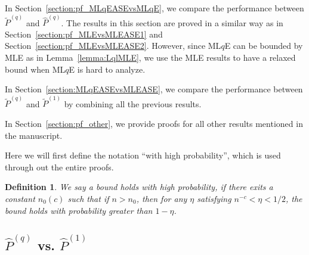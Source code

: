 \documentclass[a4paper]{article}
\newtheorem{definition}[fact]{Definition}
\renewcommand{\hat}{\widehat}
\begin{document}
In Section~\ref{section:pf_MLqEASEvsMLqE}, we compare the performance between $\widetilde{P}^{(q)}$ and $\hat{P}^{(q)}$. The results in this section are proved in a similar way as in Section~\ref{section:pf_MLEvsMLEASE1} and Section~\ref{section:pf_MLEvsMLEASE2}. However, since ML$q$E can be bounded by MLE as in Lemma~\ref{lemma:LqlMLE}, we use the MLE results to have a relaxed bound when ML$q$E is hard to analyze.

In Section~\ref{section:MLqEASEvsMLEASE}, we compare the performance between $\widetilde{P}^{(q)}$ and $\widetilde{P}^{(1)}$ by combining all the previous results.

In Section~\ref{section:pf_other}, we provide proofs for all other results mentioned in the manuscript.

Here we will first define the notation ``with high probability'', which is used through out the entire proofs.
\begin{definition}
We say a bound holds with high probability, if there exits a constant $n_0(c)$ such that if $n > n_0$, then for any $\eta$ satisfying $n^{-c} < \eta < 1/2$, the bound holds with probability greater than $1 - \eta$.
\end{definition}

\subsection{$\hat{P}^{(q)}$ vs. $\hat{P}^{(1)}$}
\label{section:pf_MLqEvsMLE}
\end{document}
